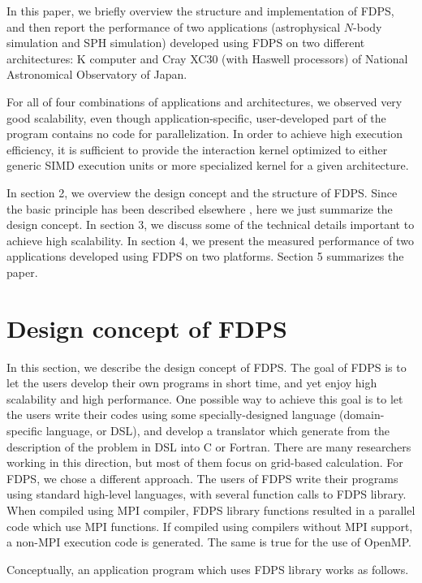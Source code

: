 \documentclass[dvipdfmx]{acm_proc_article-sp}
\begin{document}
In this paper, we briefly overview the structure and implementation of
FDPS, and then report the performance of two applications
(astrophysical $N$-body simulation and SPH simulation) developed using
FDPS on two different architectures: K computer and Cray XC30 (with
Haswell processors) of National Astronomical Observatory of Japan.

For all of four combinations of applications and architectures, we
observed very good scalability, even though application-specific,
user-developed part of the program contains no code for
parallelization. In order to achieve high execution efficiency, it is
sufficient to provide the interaction kernel optimized to either
generic SIMD execution units or more specialized kernel for a given
architecture. 

In section 2, we overview the design concept and the structure of
FDPS. Since the basic principle has been described elsewhere
{\cite{2015iwasawa}}, here we just summarize the design
concept. In section 3, we discuss some of the technical details
important to achieve high scalability. In section 4, we present the
measured performance of two applications developed using FDPS on two
platforms. Section 5 summarizes the paper.

\section{Design concept of FDPS}

\label{sec:designconcept}


In this section, we describe the design concept of FDPS.  The goal of
FDPS is to let the users develop their own programs in short time, and
yet enjoy high scalability and high performance. One possible way to
achieve this goal is to let the users write their codes using some
specially-designed language (domain-specific language, or DSL), and
develop a translator which generate from the description of the
problem in DSL into C or Fortran. There are many researchers working
in this direction, but most of them focus on grid-based
calculation. For FDPS, we chose a different approach. The users of
FDPS write their programs using standard high-level languages, with
several function calls to FDPS library. When compiled using MPI
compiler, FDPS library functions resulted in a parallel code which use
MPI functions. If compiled using compilers without MPI support, a
non-MPI execution code is generated. The same is true for the use of
OpenMP.

Conceptually, an application program which uses FDPS library works as
follows.
\end{document}
